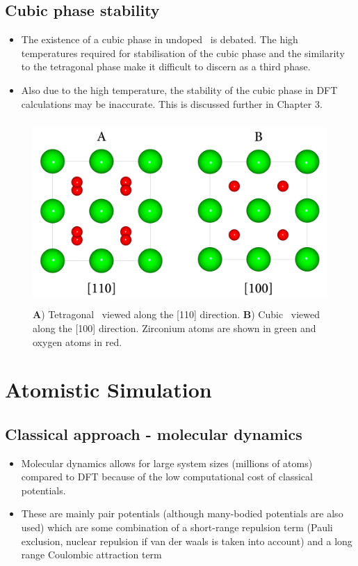 \subsection{Cubic phase stability}

\begin{itemize}
\item The existence of a cubic phase in undoped \zirconia\ is debated. The high temperatures required for stabilisation of the cubic phase and the similarity to the tetragonal phase make it difficult to discern as a third phase.
\item Also due to the high temperature, the stability of the cubic phase in DFT calculations may be inaccurate. This is discussed further in Chapter 3.
\end{itemize}

\begin{figure}[htp]
\centering
\includegraphics[height=7cm]{images/tet_vs_cubic.png}
\caption{\textbf{A}) Tetragonal \zirconia\ viewed along the [110] direction. \textbf{B}) Cubic \zirconia\ viewed along the [100] direction. Zirconium atoms are shown in green and oxygen atoms in red.}
\label{figure:tetvscubic}
\end{figure}

\section{Atomistic Simulation}

\subsection{Classical approach - molecular dynamics}

\begin{itemize}
\item Molecular dynamics allows for large system sizes (millions of atoms) compared to DFT because of the low computational cost of classical potentials. 
\item These are mainly pair potentials (although many-bodied potentials are also used) which are some combination of a short-range repulsion term (Pauli exclusion, nuclear repulsion if van der waals is taken into account) and a long range Coulombic attraction term
\end{itemize}

